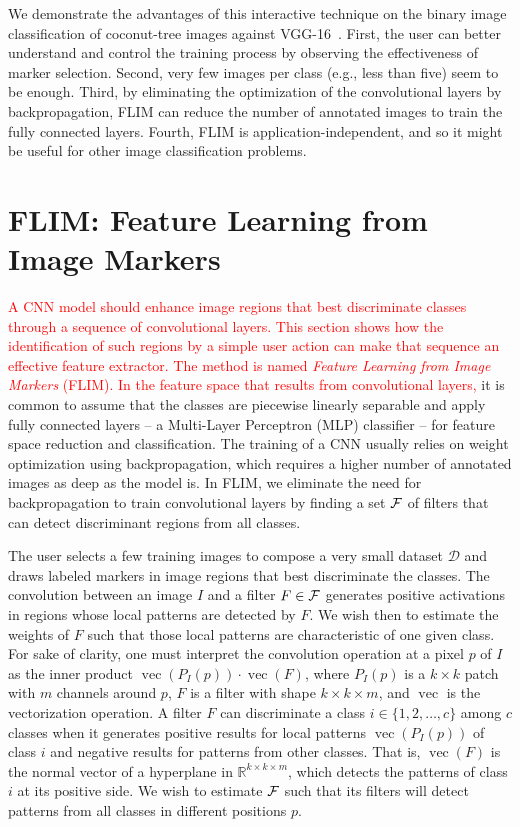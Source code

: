 \documentclass[journal, twoside]{IEEEtran}
\DeclareMathOperator{\vect}{vec}
\newcommand{\R}{\mathbb{R}}
\newcommand{\D}{\mathcal{D}}
\begin{document}
We demonstrate the advantages of this interactive technique on the binary image classification of coconut-tree images against  VGG-16~\cite{simonyan2014very}. First, the user can better understand and control the training process by observing the effectiveness of marker selection.  Second, very few images per class (e.g., less than five) seem to be enough. Third, by eliminating the optimization of the convolutional layers by backpropagation, FLIM can reduce the number of annotated images to train the fully connected layers. Fourth, FLIM is application-independent, and so it might be useful for other image classification problems.

\section{FLIM: Feature Learning from Image Markers}
\label{sec:method}
  
\textcolor{red}{A CNN model should enhance image regions that best discriminate classes through a sequence of convolutional layers. This section shows how the identification of such regions by a simple user action can make that sequence an effective feature extractor. The method is named \emph{Feature Learning from Image Markers} (FLIM). In the feature space that results from convolutional layers,} it is common to assume that the classes are piecewise linearly separable and apply fully connected layers -- a Multi-Layer Perceptron (MLP) classifier -- for feature space reduction and classification. The training of a CNN usually relies on weight optimization using backpropagation, which requires a higher number of annotated images as deep as the model is. In FLIM, we eliminate the need for backpropagation to train convolutional layers by finding a set ${\cal F}$ of filters that can detect discriminant regions from all classes.

The user selects a few training images to compose a very small dataset $\D$ and draws labeled markers in image regions that best discriminate the classes. The convolution between an image $I$ and a filter $F\in {\cal F}$ generates positive activations in regions whose local patterns are detected by $F$. We wish then to estimate the weights of $F$ such that those local patterns are characteristic of one given class. For sake of clarity, one must interpret the convolution operation at a pixel $p$ of $I$ as the inner product $\vect(P_I(p)) \cdot \vect(F)$, where $P_I(p)$ is a $k\times k$ patch with $m$ channels around $p$, $F$ is a filter with shape $k\times k \times m$, and $\vect$ is the vectorization operation. A filter $F$ can discriminate a class $i \in \{1,2,\ldots,c\}$ among $c$ classes when it generates positive results for local patterns $\vect(P_I(p))$ of class $i$ and negative results for patterns from other classes. That is, $\vect(F)$ is the normal vector of a hyperplane in $\R^{k\times k\times m}$, which detects the patterns of class $i$ at its positive side. We wish to estimate ${\cal F}$ such that its filters will detect patterns from all classes in different positions $p$. 
\end{document}
